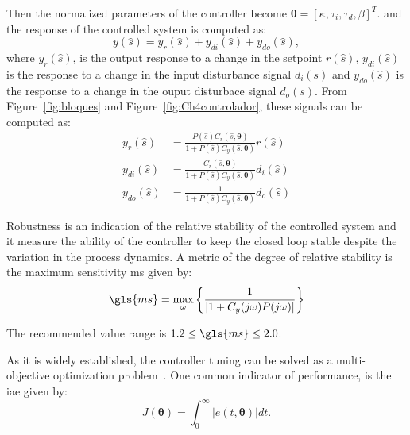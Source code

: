 Then the normalized parameters of the controller become $\bm{\theta}=\left[\kappa, \tau_i, \tau_d, \beta\right]^T$.
%
and the response of the controlled system is computed as: 
\begin{equation} 
 y(\hat{s})= y_r(\hat{s}) + y_{di}(\hat{s}) + y_{do}(\hat{s}),
\label{ys}
\end{equation}
%
where $y_r(\hat{s})$, is the output response to a change in the setpoint $r(\hat{s})$, $y_{di}(\hat{s})$ is the response to a change in the input disturbance signal $d_i(s)$ and $y_{do}(\hat{s})$ is the response to a change in the ouput disturbace signal $d_o(s)$. From Figure~\ref{fig:bloques} and Figure~\ref{fig:Ch4controlador}, these signals can be computed as:
%
\begin{align*}
 y_r(\hat{s}) &= \frac{P(\hat{s}) C_r(\hat{s},\bm{\theta}) }{1 + P(\hat{s}) C_y(\hat{s},\bm{\theta})} r(\hat{s})\\
y_{di}(\hat{s}) &=  \frac{C_r(\hat{s},\bm{\theta})}{1 + P(\hat{s}) C_y(\hat{s},\bm{\theta})} d_i(\hat{s}) \\%
y_{do}(\hat{s}) &= \frac{1}{1 + P(\hat{s}) C_y(\hat{s},\bm{\theta})} {d_o(\hat{s})}
\label{ytot}
\end{align*}


Robustness is an indication of the relative stability of the controlled system and it measure the ability of the controller to keep the closed loop stable despite the variation in the process dynamics. A metric of the degree of relative stability is the maximum sensitivity \gls{ms} given by:
%
\begin{equation}  %
\gls{ms}=  \max_\omega \left\{ \frac{1}{\left |{1 + C_y(j\omega ) P(j\omega )}\right |}\right\} 
\label{Ms}
\end{equation}

The recommended value range is  $1.2\leq \gls{ms} \leq 2.0$.

As it is widely established, the controller tuning can be solved as a multi-objective optimization problem~\cite{Gambier2007}. One common indicator of performance, is the \gls{iae} given by:
%
\begin{equation}  %
J(\bm{\theta})=\int_0^\infty \left |{e(t,\bm{\theta})}\right | dt.
\label{IAE}
\end{equation}


